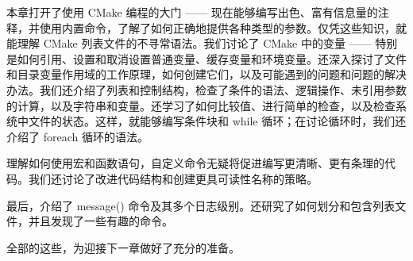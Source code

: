 本章打开了使用 CMake 编程的大门 —— 现在能够编写出色、富有信息量的注释，并使用内置命令，了解了如何正确地提供各种类型的参数。仅凭这些知识，就能理解 CMake 列表文件的不寻常语法。我们讨论了 CMake 中的变量 —— 特别是如何引用、设置和取消设置普通变量、缓存变量和环境变量。还深入探讨了文件和目录变量作用域的工作原理，如何创建它们，以及可能遇到的问题和问题的解决办法。我们还介绍了列表和控制结构，检查了条件的语法、逻辑操作、未引用参数的计算，以及字符串和变量。还学习了如何比较值、进行简单的检查，以及检查系统中文件的状态。这样，就能够编写条件块和 while 循环；在讨论循环时，我们还介绍了 foreach 循环的语法。

理解如何使用宏和函数语句，自定义命令无疑将促进编写更清晰、更有条理的代码。我们还讨论了改进代码结构和创建更具可读性名称的策略。

最后，介绍了 message() 命令及其多个日志级别。还研究了如何划分和包含列表文件，并且发现了一些有趣的命令。

全部的这些，为迎接下一章做好了充分的准备。
